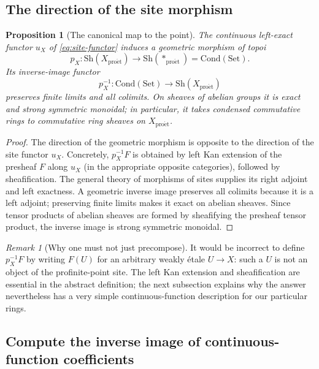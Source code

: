 \documentclass[11pt,a4paper]{article}
\numberwithin{equation}{section}
\newtheorem{proposition}[theorem]{Proposition}
\theoremstyle{definition}
\theoremstyle{remark}
\newtheorem{remark}[theorem]{Remark}
\newcommand{\Cond}{\mathrm{Cond}}
\newcommand{\Sh}{\mathrm{Sh}}
\newcommand{\proet}{\mathrm{pro\acute{e}t}}
\begin{document}
\subsection{The direction of the site morphism}

\begin{proposition}[The canonical map to the point]\label{prop:pX}
The continuous left-exact functor $u_X$ of \eqref{eq:site-functor}
induces a geometric morphism of topoi
\begin{equation}\label{eq:pX}
     \boxed{\quad
       p_X:\Sh(X_{\proet})\longrightarrow
          \Sh(*_{\proet})=\Cond(\mathrm{Set}).\quad}
\end{equation}
Its inverse-image functor
\[
  p_X^{-1}:\Cond(\mathrm{Set})\longrightarrow\Sh(X_{\proet})
\]
preserves finite limits and all colimits.  On sheaves of abelian groups
it is exact and strong symmetric monoidal; in particular, it takes
condensed commutative rings to commutative ring sheaves on $X_{\proet}$.
\end{proposition}
\begin{proof}
The direction of the geometric morphism is opposite to the direction
of the site functor $u_X$.  Concretely, $p_X^{-1}F$ is obtained by
left Kan extension of the presheaf $F$ along $u_X$ (in the appropriate
opposite categories), followed by sheafification.  The general theory
of morphisms of sites supplies its right adjoint and left exactness.
A geometric inverse image preserves all colimits because it is a left
adjoint; preserving finite limits makes it exact on abelian sheaves.
Since tensor products of abelian sheaves are formed by sheafifying the
presheaf tensor product, the inverse image is strong symmetric monoidal.
\end{proof}

\begin{remark}[Why one must not just precompose]
It would be incorrect to define $p_X^{-1}F$ by writing
$F(U)$ for an arbitrary weakly \'{e}tale $U\to X$: such a $U$ is not an
object of the profinite-point site.  The left Kan extension and
sheafification are essential in the abstract definition; the next
subsection explains why the answer nevertheless has a very simple
continuous-function description for our particular rings.
\end{remark}

\subsection{Compute the inverse image of continuous-function coefficients}
\end{document}
